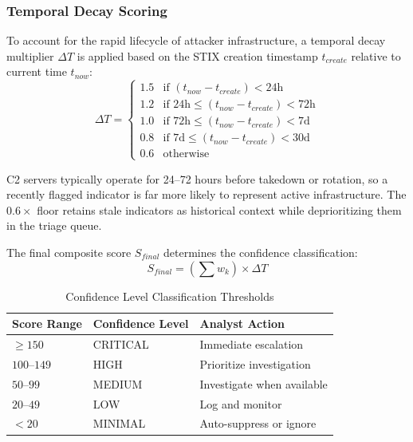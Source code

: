 \documentclass[conference]{IEEEtran}
\begin{document}
\subsubsection{Temporal Decay Scoring}
To account for the rapid lifecycle of attacker infrastructure, a temporal decay multiplier $\Delta T$ is applied based on the STIX creation timestamp $t_{create}$ relative to current time $t_{now}$:
\begin{equation}
\Delta T =
\begin{cases}
1.5 & \text{if } (t_{now} - t_{create}) < 24\text{h} \\
1.2 & \text{if } 24\text{h} \leq (t_{now} - t_{create}) < 72\text{h} \\
1.0 & \text{if } 72\text{h} \leq (t_{now} - t_{create}) < 7\text{d} \\
0.8 & \text{if } 7\text{d} \leq (t_{now} - t_{create}) < 30\text{d} \\
0.6 & \text{otherwise}
\end{cases}
\end{equation}

C2 servers typically operate for 24--72 hours before takedown or rotation, so a recently flagged indicator is far more likely to represent active infrastructure. The $0.6\times$ floor retains stale indicators as historical context while deprioritizing them in the triage queue.

The final composite score $S_{final}$ determines the confidence classification:
\begin{equation}
S_{final} = \left( \sum w_k \right) \times \Delta T
\end{equation}

\begin{table}[h]
\caption{Confidence Level Classification Thresholds}
\centering
\begin{tabular}{lll}
\toprule
\textbf{Score Range} & \textbf{Confidence Level} & \textbf{Analyst Action} \\
\midrule
$\geq 150$ & CRITICAL & Immediate escalation \\
$100$--$149$ & HIGH & Prioritize investigation \\
$50$--$99$ & MEDIUM & Investigate when available \\
$20$--$49$ & LOW & Log and monitor \\
$< 20$ & MINIMAL & Auto-suppress or ignore \\
\bottomrule
\end{tabular}
\label{tab:confidence}
\end{table}
\end{document}
